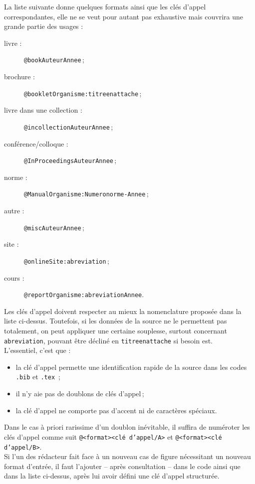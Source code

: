 \documentclass[a4paper, 11pt, twoside, fleqn]{memoir}
\begin{document}
La liste suivante donne quelques formats ainsi que les clés d'appel correspondantes, elle ne se veut pour autant pas exhaustive mais couvrira une grande partie des usages :

\begin{description}
\item [livre :] \texttt{@book{AuteurAnnee}}\,;
\item [brochure :] \texttt{@booklet{Organisme:titreenattache}}\,;
\item [livre dans une collection :] \texttt{@incollection{AuteurAnnee}}\,;
\item [conférence/colloque :] \texttt{@InProceedings{AuteurAnnee}}\,;
\item [norme :] \texttt{@Manual{Organisme:Numeronorme-Annee}}\,;
\item [autre :] \texttt{@misc{AuteurAnnee}}\,;
\item [site :] \texttt{@online{Site:abreviation}}\,;
\item [cours :] \texttt{@report{Organisme:abreviationAnnee}}.\\
\end{description}  

Les clés d'appel doivent respecter au mieux la nomenclature proposée dans la liste ci-dessus. Toutefois, si les données de la source ne le permettent pas totalement, on peut appliquer une certaine souplesse, surtout concernant \texttt{abreviation}, pouvant être décliné en \texttt{titreenattache} si besoin est.\\
L'essentiel, c'est que :
\begin{itemize}
\item la clé d'appel permette une identification rapide de la source dans les codes \texttt{.bib} et \texttt{.tex} \,;
\item il n'y aie pas de doublons de clés d'appel\,;
\item la clé d'appel ne comporte pas d'accent ni de caractères spéciaux.
\end{itemize}
Dans le cas à priori rarissime d'un doublon inévitable, il suffira de numéroter les clés d'appel comme suit \texttt{@<format>{<clé d'appel/A>}} et \texttt{@<format>{<clé d'appel/B>}}.\\

Si l'un des rédacteur fait face à un nouveau cas de figure nécessitant un nouveau format d'entrée, il faut l'ajouter -- après consultation -- dans le code  ainsi que dans la liste ci-dessus, après lui avoir défini une clé d'appel structurée.\\
\end{document}
